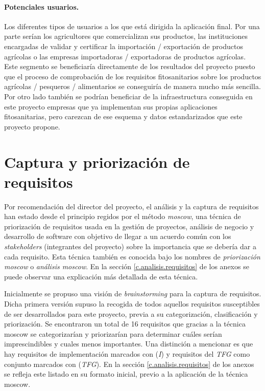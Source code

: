 \paragraph*{Potenciales usuarios.} Los diferentes tipos de usuarios a los que está dirigida la aplicación final. Por una parte serían los  agricultores que comercializan sus productos, las instituciones encargadas de validar y certificar la importación / exportación  de productos agrícolas o las empresas importadoras / exportadoras de productos agrícolas. Este segmento se beneficiaría directamente de los resultados del proyecto puesto que el proceso de comprobación de los requisitos fitosanitarios sobre los productos agrícolas / pesqueros / alimentarios se conseguiría de manera mucho más sencilla. Por otro lado también se podrían beneficiar de la infraestructura conseguida en este proyecto empresas que ya implementan sus propias aplicaciones fitosanitarias, pero carezcan de ese esquema y datos estandarizados que este proyecto propone.




\section{Captura y priorización de requisitos} \label{phytoscheme.requisitos}
\par 
Por recomendación del director del proyecto, el análisis y la captura de requisitos han estado desde el principio  regidos por el método \textit{\gls{moscow}}, una técnica de priorización de requisitos usada en la gestión de proyectos, análisis de negocio y desarrollo de software con objetivo de llegar a un acuerdo común con los \textit{stakeholders} (integrantes del proyecto) sobre la importancia que se debería dar a cada requisito. Esta técnica también es conocida bajo los nombres de \textit{priorización \gls{moscow}} o \textit{análisis \gls{moscow}}. En la sección \ref{c.analisis.requisitos} de los anexos se puede observar una explicación más detallada de esta técnica.

\par Inicialmente se propuso una visión de \textit{brainstorming} para la captura de requisitos. Dicha primera versión supuso la recogida de todos aquellos requisitos susceptibles de ser desarrollados para este proyecto, previa a su categorización, clasificación y priorización. Se encontraron un total de 16 requisitos que gracias a la técnica \gls{moscow} se categorizarían y priorizarían para determinar cuáles serían imprescindibles y cuales menos importantes. Una distinción a mencionar es que hay requisitos de implementación marcados con (\textit{I}) y requisitos del \textit{TFG} como conjunto marcados con (\textit{TFG}). En la sección \ref{c.analisis.requisitos} de los anexos se refleja este listado en su formato inicial, previo a la aplicación de la técnica \gls{moscow}.



